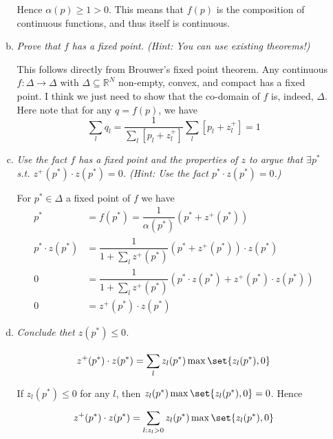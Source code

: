 \documentclass{article}
\begin{document}
\begin{enumerate}[1.]
\begin{enumerate}[a)]
        Hence $\alpha(p) \ge 1 > 0$. This means that $f(p)$ is the composition of continuous functions, and thus itself is continuous.

      \item \textit{Prove that $f$ has a fixed point. (Hint: You can use existing theorems!)}

        \solution This follows directly from Brouwer's fixed point theorem. Any continuous $f: \Delta \to \Delta$ with $\Delta \subseteq \mathbb{R}^N$ non-empty, convex, and compact has a fixed point. I think we just need to show that the co-domain of $f$ is, indeed, $\Delta$. Here note that for any $q = f(p)$, we have
        \[
          \sum^{}_{l} q_l = \dfrac{1}{\sum^{}_{l} \left[p_l + z^+_l\right]} \sum^{}_{l} \left[p_l + z^+_l\right] = 1
        \]

      \item \textit{Use the fact $f$ has a fixed point and the properties of $z$ to argue that $\exists p^*$ s.t. $z^+(p^*) \cdot z(p^*) = 0$. (Hint: Use the fact $p^* \cdot z(p^*) = 0$.)}

        \solution For $p^* \in \Delta$ a fixed point of $f$ we have
        \begin{equation}
          \begin{array}{rl}
            p^*
            & = f(p^*) = \dfrac{1}{\alpha(p^*)} \left(p^* + z^+(p^*)\right)
            \\
            p^* \cdot z(p^*)
            & = \dfrac{1}{1 + \sum^{}_{l} z^+(p^*)} \left(p^* + z^+(p^*)\right) \cdot z(p^*)
            \\
            0
            & = \dfrac{1}{1 + \sum^{}_{l} z^+(p^*)} \left(p^* \cdot z(p^*) + z^+(p^*) \cdot z(p^*)\right)
            \\
            0
            & = z^+(p^*) \cdot z(p^*)
          \end{array}
          \nonumber
        \end{equation}

      \item \textit{Conclude thet $z(p^*) \le 0$.}

        \solution
        \[
          z^+(p^*) \cdot z(p^*)
          =
          \sum^{}_{l} z_l(p^*) \max\set{z_l(p^*), 0}
        \]

        If $z_l(p^*) \le 0$ for any $l$, then $z_l(p^*) \max\set{z_l(p^*), 0} = 0$. Hence
        \[
          z^+(p^*) \cdot z(p^*)
          =
          \sum^{}_{l: z_l > 0} z_l(p^*) \max\set{z_l(p^*), 0}
        \]


\end{enumerate}
\end{enumerate}
\end{document}

